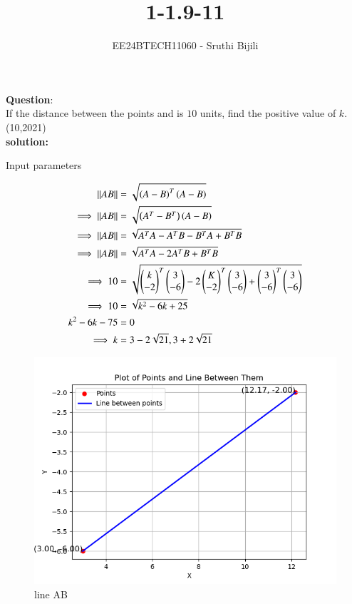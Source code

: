 \documentclass[journal]{IEEEtran}
\begin{document}

\vspace{3cm}

\title{1-1.9-11}
\author{EE24BTECH11060 - Sruthi Bijili}
{\let\newpage\relax\maketitle}

\renewcommand{\thefigure}{\theenumi}
\renewcommand{\thetable}{\theenumi}
\setlength{\intextsep}{10pt} %


\renewcommand{\thetable}{\theenumi}

\textbf{Question}:\\
If the distance between the points  and  is $10$ units, find the positive value of $k$.
\hfill(10,2021)\\
\textbf{solution:}
\begin{table}[h!]    
  \centering
  
  \caption{Input parameters}
\end{table}
\begin{align}
\left\vert\left\vert AB\right\vert\right\vert&=\sqrt{\left(A-B\right)^T\left(A-B\right)}\\
\implies \left\vert\left\vert AB\right\vert\right\vert&=\sqrt{\left(A^T-B^T\right)\left(A-B\right)}\\
\implies \left\vert\left\vert AB\right\vert\right\vert&=\sqrt{A^TA-A^TB-B^TA+B^TB}\\
\implies \left\vert\left\vert AB\right\vert\right\vert&=\sqrt{A^TA-2A^TB+B^TB}\\
\implies 10 &=\sqrt{\begin{pmatrix}k \\ -2\end{pmatrix}^T\begin{pmatrix}3 \\-6\end{pmatrix}-2\begin{pmatrix}K \\-2\end{pmatrix}^T\begin{pmatrix}3\\-6\end{pmatrix}+\begin{pmatrix}3\\-6\end{pmatrix}^T\begin{pmatrix}3\\-6\end{pmatrix}}\\
\implies 10 &=\sqrt{k^2-6k+25}\\
k^2-6k-75&=0\\
\implies k&=3-2\sqrt{21},3+2\sqrt{21}
\end{align}
\begin{figure}[h!]
   \centering
   \includegraphics[width=0.7\linewidth]{figs/fig1.png}
   \caption{line AB}
\end{figure}
\end{document}
